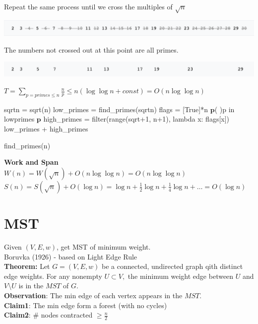 \documentclass[12pt]{article}
\begin{document}
Repeat the same process until we cross the multiples of $\sqrt{n}$

\includegraphics[scale=0.5]{img3}

\clearpage

The numbers not crossed out at this point are all primes.

\includegraphics[scale=0.5]{img4}

$T = \sum_{p=primes\leq n} \frac{n}{p} \leq n(\log \log n + const) = O(n \log \log n)$  

\begin{algorithm}[H]
\SetAlgoLined
 sqrtn = sqrt(n)\;
 low\_primes = find\_primes(sqrtn)  
 flags = [True]*n\;
 $\textbf{p}$\For( ){p in lowprimes}{ 
 	$\textbf{p}$
 }
	high\_primes = filter(range(sqrt+1, n+1), lambda x: flags[x]) 
 \Return low\_primes + high\_primes
 \caption{find\_primes(n)}
\end{algorithm}
\textbf{Work and Span}\\
$W(n) = W(\sqrt{n}) + O(n \log \log n) = O(n \log \log n)$\\
$S(n) = S(\sqrt{n}) + O(\log n) = \log n + \frac{1}{2}\log n + \frac{1}{4} \log n + \ldots = O(\log n)$ 

\section{MST}
Given $(V, E, w)$, get MST of minimum weight.\\
Boruvka (1926) - based on Light Edge Rule\\
\textbf{Theorem:} Let $G = (V,E,w)$ be a connected, undirected graph qith distinct edge weights. For any nonempty $U \subset V,$ the minimum weight edge between $U$ and $V \setminus  U$ is in the $MST$ of $G$.\\
\textbf{Observation}: The min edge of each vertex appears in the $MST$.\\
\textbf{Claim1}: The min edge form a forest (with no cycles)\\
\textbf{Claim2}: \# nodes contracted $\geq \frac{n}{2}$
\end{document}
